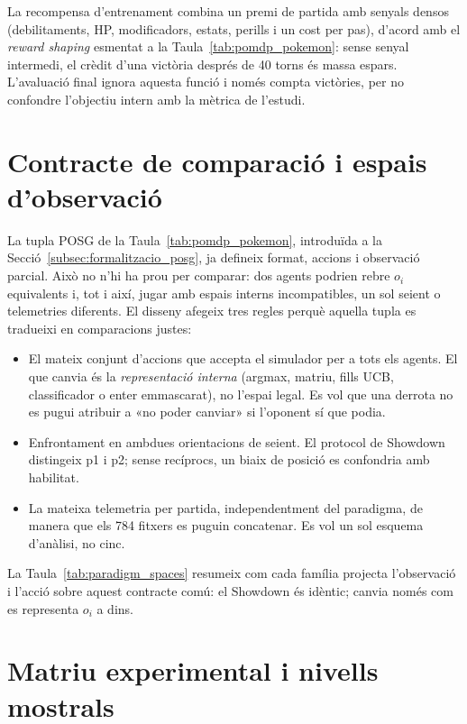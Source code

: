 La recompensa d'entrenament combina un premi de partida amb senyals densos (debilitaments, HP, modificadors, estats, perills i un cost per pas), d'acord amb el \emph{reward shaping} esmentat a la Taula~\ref{tab:pomdp_pokemon}: sense senyal intermedi, el crèdit d'una victòria després de 40 torns és massa espars. L'avaluació final ignora aquesta funció i només compta victòries, per no confondre l'objectiu intern amb la mètrica de l'estudi.

\section{Contracte de comparació i espais d'observació}
\label{sec:entorn}
\label{sec:espais}

La tupla POSG de la Taula~\ref{tab:pomdp_pokemon}, introduïda a la Secció~\ref{subsec:formalitzacio_posg}, ja defineix format, accions i observació parcial. Això no n'hi ha prou per comparar: dos agents podrien rebre $o_i$ equivalents i, tot i així, jugar amb espais interns incompatibles, un sol seient o telemetries diferents. El disseny afegeix tres regles perquè aquella tupla es tradueixi en comparacions justes:

\begin{itemize}
    \item El mateix conjunt d'accions que accepta el simulador per a tots els agents. El que canvia és la \emph{representació interna} (argmax, matriu, fills UCB, classificador o enter emmascarat), no l'espai legal. Es vol que una derrota no es pugui atribuir a «no poder canviar» si l'oponent sí que podia.
    \item Enfrontament en ambdues orientacions de seient. El protocol de Showdown distingeix p1 i p2; sense recíprocs, un biaix de posició es confondria amb habilitat.
    \item La mateixa telemetria per partida, independentment del paradigma, de manera que els 784 fitxers es puguin concatenar. Es vol un sol esquema d'anàlisi, no cinc.
\end{itemize}

La Taula~\ref{tab:paradigm_spaces} resumeix com cada família projecta l'observació i l'acció sobre aquest contracte comú: el Showdown és idèntic; canvia només com es representa $o_i$ a dins.



\section{Matriu experimental i nivells mostrals}
\label{sec:n_10k}

